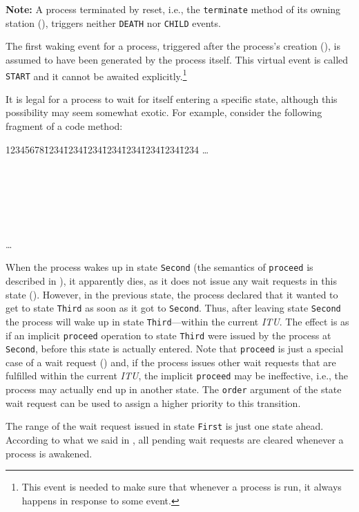 \noindent
{\bf Note:}
A process terminated by reset, i.e., the {\tt terminate} method of its
owning station (), triggers neither {\tt DEATH} nor
{\tt CHILD} events.

\medskip

The first waking event for a process, triggered after the process's creation
(), is assumed to have been generated by the process itself.
This virtual event is called {\tt START} and it cannot be awaited
explicitly.\footnote{This event is needed to make sure that whenever a process
is run, it always happens in response to some event.}

It is legal for a process to wait for itself entering a specific state,
although this possibility may seem somewhat exotic.
For example, consider the following fragment of a code method:
{\tt\begin{tabbing}
12345678\=1234\=1234\=1234\=1234\=1234\=1234\=1234\=1234\kill
\>\ldots \\
 \\
\> \\
\> \\
 \\
\>  \\
 \\
\> \ldots \\
\end{tabbing}}
When the process wakes up in state {\tt Second} (the semantics of {\tt proceed}
is described in ), it apparently dies, as it does not issue any
wait requests in this state ().
However, in the previous state, the process declared that it wanted to get to
state {\tt Third} as soon as it got to {\tt Second}.
Thus, after leaving state {\tt Second} the process will wake up in state
{\tt Third}---within the current {\em ITU}.
The effect is as if an implicit
{\tt proceed} operation to state {\tt Third} were
issued by the process at {\tt Second}, before this state is actually
entered.
Note that {\tt proceed} is just a special case of a wait request
() and, if the process issues other wait requests that are
fulfilled within the current {\em ITU}, the implicit {\tt proceed} may
be ineffective, i.e., the process may actually end up in another state.
The {\tt order} argument of the state wait request can be used to assign
a higher priority to this transition.

The range of the wait request issued in state {\tt First} is just
one state ahead.
According to what we said in ,
all pending wait requests are cleared whenever a process is awakened.

